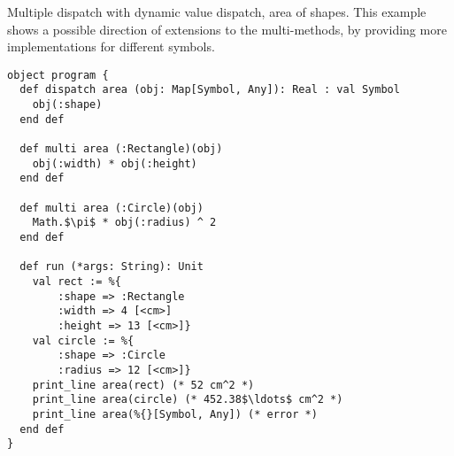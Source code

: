 \example Multiple dispatch with dynamic value dispatch, area of shapes. This example shows a possible direction of extensions to the multi-methods, by providing more implementations for different symbols. 
\begin{lstlisting}
object program {
  def dispatch area (obj: Map[Symbol, Any]): Real : val Symbol
    obj(:shape)
  end def
  
  def multi area (:Rectangle)(obj)
    obj(:width) * obj(:height)
  end def
  
  def multi area (:Circle)(obj)
    Math.$\pi$ * obj(:radius) ^ 2
  end def
  
  def run (*args: String): Unit
    val rect := %{
        :shape => :Rectangle
        :width => 4 [<cm>]
        :height => 13 [<cm>]}
    val circle := %{
        :shape => :Circle
        :radius => 12 [<cm>]}
    print_line area(rect) (* 52 cm^2 *)
    print_line area(circle) (* 452.38$\ldots$ cm^2 *)
    print_line area(%{}[Symbol, Any]) (* error *)
  end def
}
\end{lstlisting}















